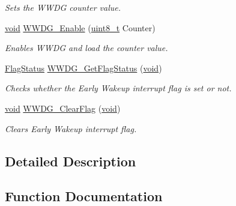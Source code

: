 \begin{DoxyCompactItemize}
\begin{DoxyCompactList}\small\item\em Sets the W\+W\+DG counter value. \end{DoxyCompactList}\item 
\hyperlink{usb__devapi_8h_afabf60e7f57651d6d595a02c75f07cd0}{void} \hyperlink{group___w_w_d_g___exported___functions_ga10dc2554d0b504b5472e3ecf0f02a9e6}{W\+W\+D\+G\+\_\+\+Enable} (\hyperlink{_p_e___types_8h_aba7bc1797add20fe3efdf37ced1182c5}{uint8\+\_\+t} Counter)
\begin{DoxyCompactList}\small\item\em Enables W\+W\+DG and load the counter value. \end{DoxyCompactList}\item 
\hyperlink{agilefox_2library_2inc_2stm32f10x__type_8h_a89136caac2e14c55151f527ac02daaff}{Flag\+Status} \hyperlink{group___w_w_d_g___exported___functions_ga7df4882d45918b9b8249dfca1e44fabc}{W\+W\+D\+G\+\_\+\+Get\+Flag\+Status} (\hyperlink{usb__devapi_8h_afabf60e7f57651d6d595a02c75f07cd0}{void})
\begin{DoxyCompactList}\small\item\em Checks whether the Early Wakeup interrupt flag is set or not. \end{DoxyCompactList}\item 
\hyperlink{usb__devapi_8h_afabf60e7f57651d6d595a02c75f07cd0}{void} \hyperlink{group___w_w_d_g___exported___functions_gabd2b5a6317c2e1a3ab0795838ce59dd2}{W\+W\+D\+G\+\_\+\+Clear\+Flag} (\hyperlink{usb__devapi_8h_afabf60e7f57651d6d595a02c75f07cd0}{void})
\begin{DoxyCompactList}\small\item\em Clears Early Wakeup interrupt flag. \end{DoxyCompactList}\end{DoxyCompactItemize}


\subsection{Detailed Description}


\subsection{Function Documentation}
